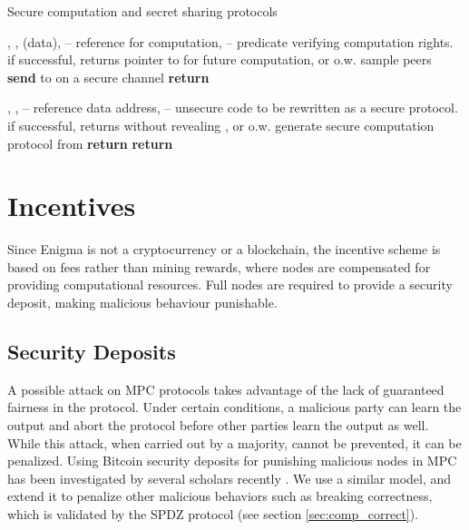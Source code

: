 \documentclass{article} \usepackage{nips13submit_e,times}
\begin{document}
\begin{algorithm}
\caption{Secure computation and secret sharing protocols}\label{alg:share}
\begin{algorithmic}
\Require , ,  (data),  -- reference for computation,  -- predicate verifying computation rights.
\Ensure if successful, returns pointer to  for future computation, or  o.w.
	\State 
	\State  sample  peers
	\For{}
		\State \textbf{send}  to  on a secure channel
	\EndFor
	\State \textbf{return} 
\EndProcedure

\Require , ,  -- reference data address,  -- unsecure code to be rewritten as a secure protocol.
\Ensure if successful, returns  without revealing  , or  o.w.
	\State 
	\If {}
		\State  generate secure computation protocol from 
		\State \textbf{return} 
	\EndIf
	\State \textbf{return} 
\EndProcedure
\end{algorithmic}
\end{algorithm}







\section{Incentives}

Since Enigma is not a cryptocurrency or a blockchain, the incentive scheme is based on fees rather than mining rewards, where nodes are compensated for providing computational resources. Full nodes are required to provide a security deposit, making malicious behaviour punishable.

\subsection{Security Deposits}

A possible attack on MPC protocols takes advantage of the lack of guaranteed fairness in the protocol. Under certain conditions, a malicious party can learn the output and abort the protocol before other parties learn the output as well. While this attack, when carried out by a majority, cannot be prevented, it can be penalized. Using Bitcoin security deposits for punishing malicious nodes in MPC has been investigated by several scholars recently \cite{deposits1, deposits2}. We use a similar model, and extend it to penalize other malicious behaviors such as breaking correctness, which is validated by the SPDZ protocol (see section \ref{sec:comp_correct}).
\end{document}
